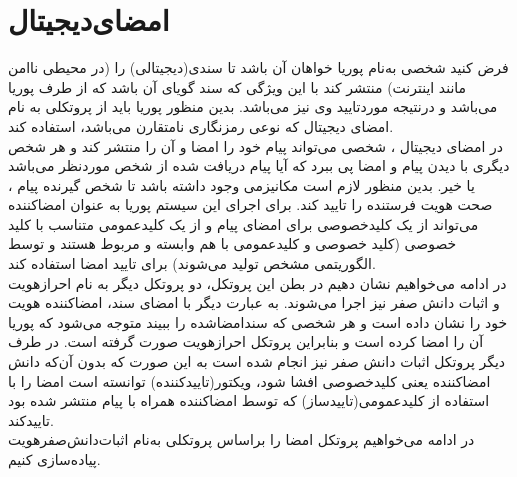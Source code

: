 
\chapter{امضای‌دیجیتال}\label{DS}
فرض کنید شخصی به‌نام پوریا خواهان آن باشد تا سندی(دیجیتالی) را (در محیطی ناامن مانند اینترنت) منتشر کند با این ویژگی که سند گویای آن باشد که از طرف پوریا می‌باشد و درنتیجه موردتایید وی نیز می‌باشد. بدین منظور پوریا باید از پروتکلی به نام امضای دیجیتال که نوعی رمزنگاری نامتقارن می‌باشد، استفاده کند. 
\\
در امضای دیجیتال ، شخصی می‌تواند پیام خود را امضا و آن را منتشر کند و هر شخص دیگری با دیدن پیام و امضا  پی ببرد که آیا پیام دریافت شده از شخص موردنظر می‌باشد یا خیر. بدین منظور لازم است مکانیزمی وجود داشته باشد تا شخص گیرنده پیام ، صحت هویت فرستنده را تایید کند. برای اجرای این سیستم پوریا به عنوان امضاکننده می‌تواند از یک کلیدخصوصی برای امضای پیام و از یک کلیدعمومی متناسب با کلید خصوصی (کلید خصوصی و کلید‌عمومی با هم وابسته و مربوط هستند و توسط الگوریتمی مشخص تولید می‌شوند) برای تایید امضا استفاده کند. 
\\
در ادامه می‌خواهیم نشان دهیم در بطن این پروتکل، دو پروتکل دیگر به نام  احراز‌هویت  و اثبات دانش صفر نیز اجرا می‌شوند. به عبارت دیگر با امضای سند، امضاکننده هویت خود را نشان داده است و هر شخصی که سندامضاشده را ببیند متوجه می‌شود که پوریا آن را امضا کرده است و بنابراین پروتکل احرازهویت صورت گرفته است. در طرف دیگر پروتکل اثبات دانش صفر نیز انجام شده است به این صورت که بدون آن‌که دانش امضاکننده یعنی کلیدخصوصی افشا شود، ویکتور(تاییدکننده) توانسته است امضا را با استفاده از کلیدعمومی(تاییدساز) که توسط امضاکننده همراه با پیام  منتشر شده بود تاییدکند. 
\\
در ادامه می‌خواهیم پروتکل امضا را براساس پروتکلی به‌نام اثبات‌دانش‌صفر‌هویت پیاده‌سازی کنیم.





